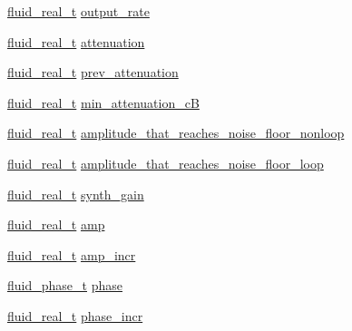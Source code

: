 \begin{DoxyCompactItemize}
\item 
\hyperlink{fluidsynth__priv_8h_a9e96f0917747b69cabb7c671bc693dbb}{fluid\+\_\+real\+\_\+t} \hyperlink{struct__fluid__rvoice__dsp__t_a5acf25d7daad12468bcfb88e638f2604}{output\+\_\+rate}
\item 
\hyperlink{fluidsynth__priv_8h_a9e96f0917747b69cabb7c671bc693dbb}{fluid\+\_\+real\+\_\+t} \hyperlink{struct__fluid__rvoice__dsp__t_a4d9190beee933797360ed1fa80400b22}{attenuation}
\item 
\hyperlink{fluidsynth__priv_8h_a9e96f0917747b69cabb7c671bc693dbb}{fluid\+\_\+real\+\_\+t} \hyperlink{struct__fluid__rvoice__dsp__t_abb0b8cf53b49753d8d6c299de9a21d2e}{prev\+\_\+attenuation}
\item 
\hyperlink{fluidsynth__priv_8h_a9e96f0917747b69cabb7c671bc693dbb}{fluid\+\_\+real\+\_\+t} \hyperlink{struct__fluid__rvoice__dsp__t_acf1b29037dbcd99eda2d680b34744781}{min\+\_\+attenuation\+\_\+cB}
\item 
\hyperlink{fluidsynth__priv_8h_a9e96f0917747b69cabb7c671bc693dbb}{fluid\+\_\+real\+\_\+t} \hyperlink{struct__fluid__rvoice__dsp__t_a7496b9829322370f19ef8bade4057693}{amplitude\+\_\+that\+\_\+reaches\+\_\+noise\+\_\+floor\+\_\+nonloop}
\item 
\hyperlink{fluidsynth__priv_8h_a9e96f0917747b69cabb7c671bc693dbb}{fluid\+\_\+real\+\_\+t} \hyperlink{struct__fluid__rvoice__dsp__t_a23d8056eab7fb440978386f2f0403d96}{amplitude\+\_\+that\+\_\+reaches\+\_\+noise\+\_\+floor\+\_\+loop}
\item 
\hyperlink{fluidsynth__priv_8h_a9e96f0917747b69cabb7c671bc693dbb}{fluid\+\_\+real\+\_\+t} \hyperlink{struct__fluid__rvoice__dsp__t_a2d9dcfc148f6037237f395e84ad54ed5}{synth\+\_\+gain}
\item 
\hyperlink{fluidsynth__priv_8h_a9e96f0917747b69cabb7c671bc693dbb}{fluid\+\_\+real\+\_\+t} \hyperlink{struct__fluid__rvoice__dsp__t_aceb3dfb35515128e0f63a62cb15e2beb}{amp}
\item 
\hyperlink{fluidsynth__priv_8h_a9e96f0917747b69cabb7c671bc693dbb}{fluid\+\_\+real\+\_\+t} \hyperlink{struct__fluid__rvoice__dsp__t_a96265ba2c9a9f3130de11685d70e8c4f}{amp\+\_\+incr}
\item 
\hyperlink{fluid__phase_8h_a58a63b6710f24684e8e7a52fe47408d6}{fluid\+\_\+phase\+\_\+t} \hyperlink{struct__fluid__rvoice__dsp__t_aaf93192acb7a5847a3d3210e65536fe6}{phase}
\item 
\hyperlink{fluidsynth__priv_8h_a9e96f0917747b69cabb7c671bc693dbb}{fluid\+\_\+real\+\_\+t} \hyperlink{struct__fluid__rvoice__dsp__t_a70f52e9b4b6c4e884ac3e9cdd19f9794}{phase\+\_\+incr}
\end{DoxyCompactItemize}


